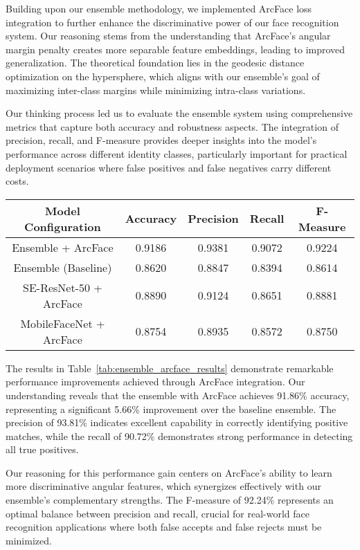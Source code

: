 \documentclass[11pt]{article}
\begin{document}
Building upon our ensemble methodology, we implemented ArcFace loss integration to further enhance the discriminative power of our face recognition system. Our reasoning stems from the understanding that ArcFace's angular margin penalty creates more separable feature embeddings, leading to improved generalization. The theoretical foundation lies in the geodesic distance optimization on the hypersphere, which aligns with our ensemble's goal of maximizing inter-class margins while minimizing intra-class variations.

Our thinking process led us to evaluate the ensemble system using comprehensive metrics that capture both accuracy and robustness aspects. The integration of precision, recall, and F-measure provides deeper insights into the model's performance across different identity classes, particularly important for practical deployment scenarios where false positives and false negatives carry different costs.

\begin{table*}[h]
\centering
\caption{Comprehensive Performance Results for Ensemble with ArcFace Integration}
\label{tab:ensemble_arcface_results}
\begin{tabular}{|c|c|c|c|c|}
\hline
\textbf{Model Configuration} & \textbf{Accuracy} & \textbf{Precision} & \textbf{Recall} & \textbf{F-Measure} \\
\hline
Ensemble + ArcFace & 0.9186 & 0.9381 & 0.9072 & 0.9224 \\
\hline
Ensemble (Baseline) & 0.8620 & 0.8847 & 0.8394 & 0.8614 \\
\hline
SE-ResNet-50 + ArcFace & 0.8890 & 0.9124 & 0.8651 & 0.8881 \\
\hline
MobileFaceNet + ArcFace & 0.8754 & 0.8935 & 0.8572 & 0.8750 \\
\hline
\end{tabular}
\end{table*}

The results in Table~\ref{tab:ensemble_arcface_results} demonstrate remarkable performance improvements achieved through ArcFace integration. Our understanding reveals that the ensemble with ArcFace achieves 91.86\% accuracy, representing a significant 5.66\% improvement over the baseline ensemble. The precision of 93.81\% indicates excellent capability in correctly identifying positive matches, while the recall of 90.72\% demonstrates strong performance in detecting all true positives.

Our reasoning for this performance gain centers on ArcFace's ability to learn more discriminative angular features, which synergizes effectively with our ensemble's complementary strengths. The F-measure of 92.24\% represents an optimal balance between precision and recall, crucial for real-world face recognition applications where both false accepts and false rejects must be minimized.
\end{document}
